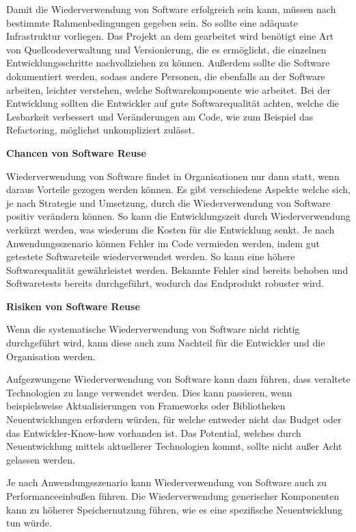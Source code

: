 \documentclass[utf8,biblatex]{lni}
\begin{document}
Damit die Wiederverwendung von Software erfolgreich sein kann, müssen nach \citet{Bauer.2016} bestimmte Rahmenbedingungen gegeben sein. So sollte eine adäquate Infrastruktur vorliegen. Das Projekt an dem gearbeitet wird benötigt eine Art von Quellcodeverwaltung und Versionierung, die es ermöglicht, die einzelnen Entwicklungsschritte nachvollziehen zu können. Außerdem sollte die Software dokumentiert werden, sodass andere Personen, die ebenfalls an der Software arbeiten, leichter verstehen, welche Softwarekomponente wie arbeitet. Bei der Entwicklung sollten die Entwickler auf gute Softwarequalität achten, welche die Lesbarkeit verbessert und Veränderungen am Code, wie zum Beispiel das Refactoring, möglichst unkompliziert zulässt. 



\textbf{Chancen von Software Reuse}


Wiederverwendung von Software findet in Organisationen nur dann statt, wenn daraus Vorteile gezogen werden können. 
Es gibt verschiedene Aspekte welche sich, je nach Strategie und Umsetzung, durch die Wiederverwendung von Software positiv verändern können. So kann die Entwicklungszeit durch Wiederverwendung verkürzt werden, was wiederum die Kosten für die Entwicklung senkt. Je nach Anwendungsszenario können Fehler im Code vermieden werden, indem gut getestete Softwareteile wiederverwendet werden. So kann eine höhere Softwarequalität gewährleistet werden. Bekannte Fehler sind bereits behoben und Softwaretests bereits durchgeführt, wodurch das Endprodukt robuster wird.


\textbf{Risiken von Software Reuse}


Wenn die systematische Wiederverwendung von Software nicht richtig durchgeführt wird, kann diese auch zum Nachteil für die Entwickler und die Organisation werden. 

Aufgezwungene Wiederverwendung von Software kann dazu führen, dass veraltete Technologien zu lange verwendet werden. Dies kann passieren, wenn beispielsweise Aktualisierungen von Frameworks oder Bibliotheken Neuentwicklungen erfordern würden, für welche entweder nicht das Budget oder das Entwickler-Know-how vorhanden ist. Das Potential, welches durch Neuentwicklung mittels aktuellerer Technologien kommt, sollte nicht außer Acht gelassen werden. 

Je nach Anwendungsszenario kann Wiederverwendung von Software auch zu Performanceeinbußen führen. Die Wiederverwendung generischer Komponenten kann zu höherer Speichernutzung führen, wie es eine spezifische Neuentwicklung tun würde. 
\end{document}
